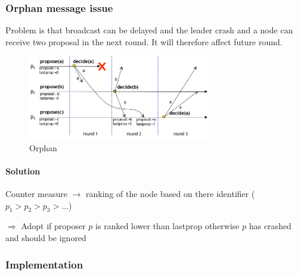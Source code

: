\subsubsection{Orphan message issue}

Problem is that broadcast can be delayed and the leader crash
and a node can receive two proposal in the next round. It will
therefore affect future round.

\begin{figure}[!ht]
    \centering
    \includegraphics[width=8cm]{img/orphan.png}
    \caption{Orphan}
\end{figure}
\FloatBarrier{}

\paragraph{Solution}

Counter measure $\to$ ranking of the node based on there identifier
($p_1>p_2>p_3>\ldots$)

$\Rightarrow$ Adopt if proposer $p$ is ranked lower than lastprop otherwise $p$ has
crashed and should be ignored

\subsubsection{Implementation}

    

